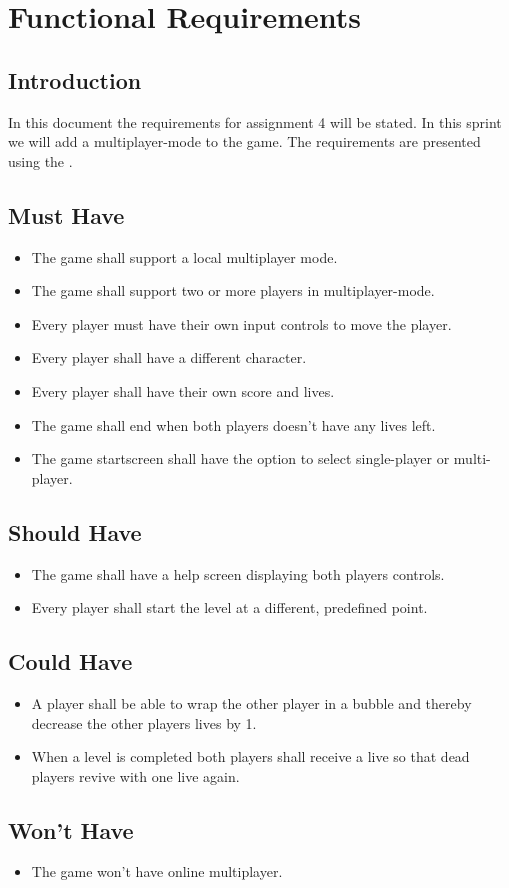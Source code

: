 \chapter{Functional Requirements}

\section{Introduction}
In this document the requirements for assignment 4 will be stated. In this sprint we will add a multiplayer-mode to the game. \noindent The requirements are presented using the .

\section{Must Have}
\begin{itemize}
\itemsep0em
\item The game shall support a local multiplayer mode.
\item The game shall support two or more players in multiplayer-mode. 
\item Every player must have their own input controls to move the player.
\item Every player shall have a different character.
\item Every player shall have their own score and lives.
\item The game shall end when both players doesn't have any lives left.
\item The game startscreen shall have the option to select single-player or multi-player. 
\end{itemize}

\section{Should Have}
\begin{itemize}
\itemsep0em
\item The game shall have a help screen displaying both players controls. 
\item Every player shall start the level at a different, predefined point. 
\end{itemize}

\section{Could Have}
\begin{itemize}
\itemsep0em
\item A player shall be able to wrap the other player in a bubble and thereby decrease the other players lives by 1. 
\item When a level is completed both players shall receive a live so that dead players revive with one live again. 
\end{itemize}

\section{Won't Have}
\begin{itemize}
\itemsep0em
\item The game won't have online multiplayer. 
\end{itemize}
